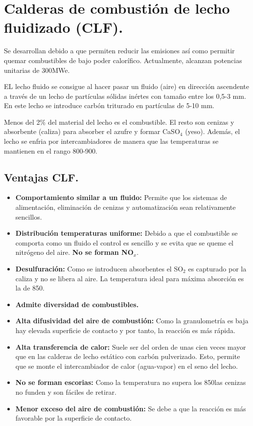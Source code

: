 \section{Calderas de combustión de lecho fluidizado (CLF).}
Se desarrollan debido a que permiten reducir las emisiones así como permitir quemar combustibles de bajo poder calorífico. Actualmente, alcanzan potencias unitarias de 300MWe.

EL lecho fluido se consigue al hacer pasar un fluido (aire) en dirección ascendente a través de un lecho de partículas sólidas inértes con tamaño entre los 0,5-3 mm. En este lecho se introduce carbón triturado en partículas de 5-10 mm.

Menos del 2\% del material del lecho es el combustible. El resto son cenizas y absorbente (caliza) para absorber el azufre y formar CaSO$_4$ (yeso). Además, el lecho se enfria por intercambiadores de manera que las temperaturas se mantienen en el rango 800-900\grado.
\subsection{Ventajas CLF.}
\begin{itemize}
	\item \textbf{Comportamiento similar a un fluido:}
		Permite que los sistemas de alimentación, eliminación de cenizas y automatización sean relativamente sencillos.
	\item \textbf{Distribución temperaturas uniforme:}
		Debido a que el combustible se comporta como un fluido el control es sencillo y se evita que se queme el nitrógeno del aire. \textbf{No se forman NO$_x$}.
	\item \textbf{Desulfuración:}
		Como se introducen absorbentes el SO$_2$ es capturado por la caliza y no se libera al aire. La temperatura ideal para máxima absorción es la de 850\grado.
	\item \textbf{Admite diversidad de combustibles.}
	\item \textbf{Alta difusividad del aire de combustión:}
		Como la granulometría es baja hay elevada superficie de contacto y por tanto, la reacción es más rápida.
	\item \textbf{Alta transferencia de calor:}
		Suele ser del orden de unas cien veces mayor que en las calderas de lecho
		estático con carbón pulverizado. Esto, permite que se monte el intercambiador de calor (agua-vapor) en el seno del lecho.
	\item \textbf{No se forman escorias:}
		Como la temperatura no supera los 850\grado las cenizas no funden y son fáciles de retirar.
	\item \textbf{Menor exceso del aire de combustión:}
		Se debe a que la reacción es más favorable por la superficie de contacto.
\end{itemize}
\newpage

